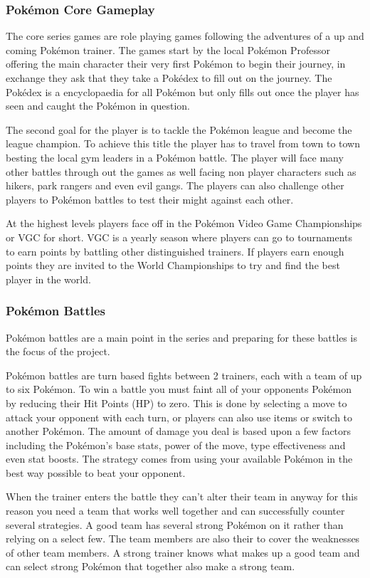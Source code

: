 \documentclass[a4paper]{article}
\newcommand{\Pokemon}{Pok\'{e}mon}
\begin{document}
\subsubsection{\Pokemon{} Core Gameplay}
\par
The core series games are role playing games following the adventures of a up and coming \Pokemon{} trainer.
The games start by the local \Pokemon{} Professor offering the main character their very first \Pokemon{} to begin their journey, in exchange they ask that they take a Pok\'{e}dex to fill out on the journey.
The Pok\'{e}dex is a encyclopaedia for all \Pokemon{} but only fills out once the player has seen and caught the \Pokemon{} in question.
\par
The second goal for the player is to tackle the \Pokemon{} league and become the league champion.
To achieve this title the player has to travel from town to town besting the local gym leaders in a \Pokemon{} battle.
The player will face many other battles through out the games as well facing non player characters such as hikers, park rangers and even evil gangs.
The players can also challenge other players to \Pokemon{} battles to test their might against each other.
\par
At the highest levels players face off in the \Pokemon{} Video Game Championships or VGC for short.
VGC is a yearly season where players can go to tournaments to earn points by battling other distinguished trainers.
If players earn enough points they are invited to the World Championships to try and find the best player in the world.

\subsubsection{\Pokemon{} Battles}
\par
\Pokemon{} battles are a main point in the series and preparing for these battles is the focus of the project.
\par
\Pokemon{} battles are turn based fights between 2 trainers, each with a team of up to six \Pokemon{}.
To win a battle you must faint all of your opponents \Pokemon{} by reducing their Hit Points (HP) to zero.
This is done by selecting a move to attack your opponent with each turn, or players can also use items or switch to another \Pokemon{}.
The amount of damage you deal is based upon a few factors including the \Pokemon{}'s base stats, power of the move, type effectiveness and even stat boosts.
The strategy comes from using your available \Pokemon{} in the best way possible to beat your opponent.
\par
When the trainer enters the battle they can't alter their team in anyway for this reason you need a team that works well together and can successfully counter several strategies.
A good team has several strong \Pokemon{} on it rather than relying on a select few.
The team members are also their to cover the weaknesses of other team members.
A strong trainer knows what makes up a good team and can select strong \Pokemon{} that together also make a strong team.
\end{document}
